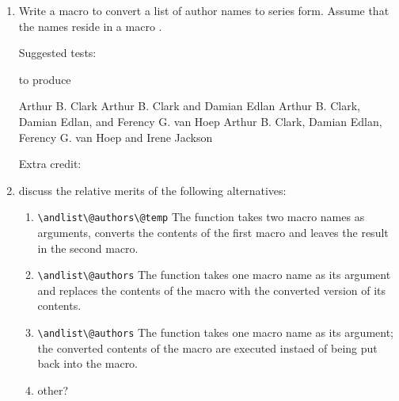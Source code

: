 \begin{enumerate}
\item Write a macro \cmd{\andlist} to convert a list of author names to 
    series form. Assume that the names reside in a macro \cmd{\@author}. 

            Suggested tests:

to produce

\begin{lcode}
Arthur B. Clark
Arthur B. Clark and Damian Edlan
Arthur B. Clark, Damian Edlan, and Ferency G. van Hoep
Arthur B. Clark, Damian Edlan, Ferency G. van Hoep and Irene Jackson
\end{lcode}


Extra credit:

\item discuss the relative merits of the following alternatives:
     
     \begin{enumerate}
\item \verb?\andlist\@authors\@temp? The function \cmd{\andlist}
            takes two macro names
            as arguments, converts the contents of the first macro and leaves
            the result in the second macro. 

\item \verb?\andlist\@authors? The function \cmd{\andlist}
            takes one macro name as its argument and replaces the 
            contents of the macro with the converted version of its contents.

\item \verb?\andlist\@authors? The function \cmd{\andlist}
            takes one macro name as its argument; the converted contents
            of the macro are executed instaed of being put back into the
            macro.

\item other?

\end{enumerate}


\end{enumerate}
